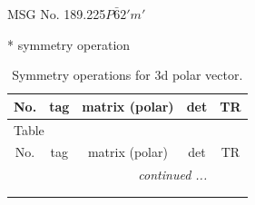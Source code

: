 \documentclass[fleqn,8pt]{jsarticle}
\begin{document}
\setcounter{MaxMatrixCols}{32}

\renewcommand{\tablename}{Table~}
\renewcommand{\figurename}{Figure~}
\begin{center}
\LARGE
MSG No. 189.225\quad$P\bar{6}2'm'$
\end{center}
* symmetry operation
\renewcommand{\arraystretch}{1.3}
\begin{longtable}{ccccc}
\caption{Symmetry operations for 3d polar vector.}
 \\
 \hline \hline
No. & tag & matrix (polar) & det & TR \\ \hline \endfirsthead

\multicolumn{4}{l}{\tablename\ \thetable{}} \\
 \hline \hline
No. & tag & matrix (polar) & det & TR \\ \hline \endhead

 \hline \hline
\multicolumn{4}{r}{\footnotesize\it continued ...} \\ \endfoot

 \hline \hline
\multicolumn{4}{r}{} \\ \endlastfoot


\end{longtable}
\end{document}
